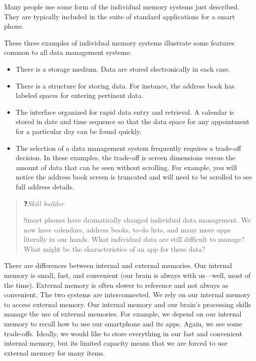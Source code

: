\documentclass[
]{article}
\begin{document}
Many people use some form of the individual memory systems just
described. They are typically included in the suite of standard
applications for a smart phone.

These three examples of individual memory systems illustrate some
features common to all data management systems:

\begin{itemize}
\item
  There is a storage medium. Data are stored electronically in each
  case.
\item
  There is a structure for storing data. For instance, the address
  book has labeled spaces for entering pertinent data.
\item
  The interface organized for rapid data entry and retrieval. A
  calendar is stored in date and time sequence so that the data space
  for any appointment for a particular day can be found quickly.
\item
  The selection of a data management system frequently requires a
  trade-off decision. In these examples, the trade-off is screen
  dimensions versus the amount of data that can be seen without
  scrolling. For example, you will notice the address book screen is
  truncated and will need to be scrolled to see full address details.
\end{itemize}

\begin{quote}
❓\emph{Skill builder}

Smart phones have dramatically changed individual data management. We
now have calendars, address books, to-do lists, and many more apps
literally in our hands. What individual data are still difficult to
manage? What might be the characteristics of an app for these data?
\end{quote}

There are differences between internal and external memories. Our
internal memory is small, fast, and convenient (our brain is always with
us---well, most of the time). External memory is often slower to
reference and not always as convenient. The two systems are
interconnected. We rely on our internal memory to access external
memory. Our internal memory and our brain's processing skills manage the
use of external memories. For example, we depend on our internal memory
to recall how to use our smartphone and its apps. Again, we see some
trade-offs. Ideally, we would like to store everything in our fast and
convenient internal memory, but its limited capacity means that we are
forced to use external memory for many items.
\end{document}
